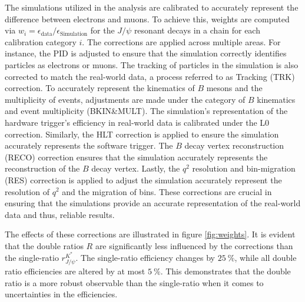 The simulations utilized in the analysis are calibrated to accurately represent the difference 
between electrons and muons. To achieve this, weights are computed via 
$w_i=\epsilon_\text{data}/\epsilon_\text{Simulation}$ for the $J\!/\!\psi$ resonant decays in a chain 
for each calibration category $i$. 
The corrections are applied across multiple areas. For instance, the PID is adjusted to ensure 
that the simulation correctly identifies particles as electrons or muons. The tracking of 
particles in the simulation is also corrected to match the real-world data, a process referred 
to as Tracking (TRK) correction.
To accurately represent the kinematics of $B$ mesons and the multiplicity of events, adjustments 
are made under the category of $B$ kinematics and event multiplicity (BKIN\&MULT). The simulation's
representation of the hardware trigger's efficiency in real-world data is calibrated under the 
L0 correction.
Similarly, the HLT correction is applied to ensure the simulation accurately represents the software 
trigger. The $B$ decay vertex reconstruction (RECO) correction ensures that the simulation accurately 
represents the reconstruction of the $B$ decay vertex.
Lastly, the $q^2$ resolution and bin-migration (RES) correction is applied to adjust the simulation 
accurately represent the resolution of $q^2$ and the migration of bins. These corrections are crucial 
in ensuring that the simulations provide an accurate representation of the real-world data and thus, 
reliable results.

The effects of these corrections are illustrated in figure \ref{fig:weights}. 
It is evident that the double ratios $R$ are 
significantly less influenced by the corrections than the single-ratio $r^{K^*}_{J\!/\!\psi}$. 
The single-ratio efficiency changes by $\SI{25}{\%}$, while all double ratio efficiencies are 
altered by at most $\SI{5}{\%}$. This demonstrates that the double ratio is a more robust observable 
than the single-ratio when it comes to uncertainties in the efficiencies.


